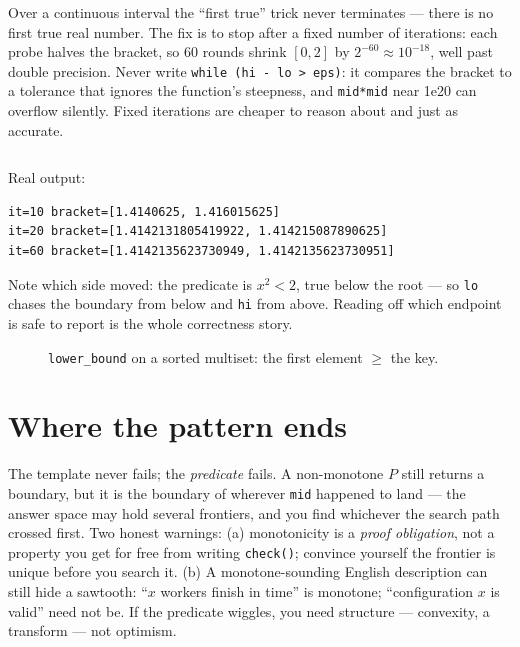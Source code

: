 Over a continuous interval the ``first true'' trick never terminates ---
there is no first true real number. The fix is to stop after a fixed
number of iterations: each probe halves the bracket, so 60 rounds shrink
$[0,2]$ by $2^{-60} \approx 10^{-18}$, well past double precision.
Never write \texttt{while (hi - lo > eps)}: it compares the bracket to a
tolerance that ignores the function's steepness, and \texttt{mid*mid}
near 1e20 can overflow silently. Fixed iterations are cheaper to reason
about and just as accurate.

\begin{lstlisting}[language=C++,caption={\texttt{real\_bsearch.cpp}:
60 iterations to $\sqrt 2$ --- the bracket, not the midpoint, is the
deliverable.},label={lst:real}]
\end{lstlisting}

Real output:
\begin{lstlisting}[numbers=none]
it=10 bracket=[1.4140625, 1.416015625]
it=20 bracket=[1.4142131805419922, 1.414215087890625]
it=60 bracket=[1.4142135623730949, 1.4142135623730951]
\end{lstlisting}

Note which side moved: the predicate is $x^2 < 2$, true below the root
--- so \texttt{lo} chases the boundary from below and \texttt{hi} from
above. Reading off which endpoint is safe to report is the whole
correctness story.


\begin{figure}[htbp]\centering

\caption{\texttt{lower\_bound} on a sorted multiset: the first element $\ge$ the key.}
\label{fig:multiset}
\end{figure}

\section{Where the pattern ends}\label{sec:bs-limits}

The template never fails; the \emph{predicate} fails. A non-monotone
$P$ still returns a boundary, but it is the boundary of wherever
\texttt{mid} happened to land --- the answer space may hold several
frontiers, and you find whichever the search path crossed first. Two
honest warnings: (a) monotonicity is a \emph{proof obligation}, not a
property you get for free from writing \texttt{check()}; convince
yourself the frontier is unique before you search it.
(b) A monotone-sounding English description can still hide a sawtooth:
``$x$ workers finish in time'' is monotone; ``configuration $x$ is
valid'' need not be. If the predicate wiggles, you need structure ---
convexity, a transform --- not optimism.

